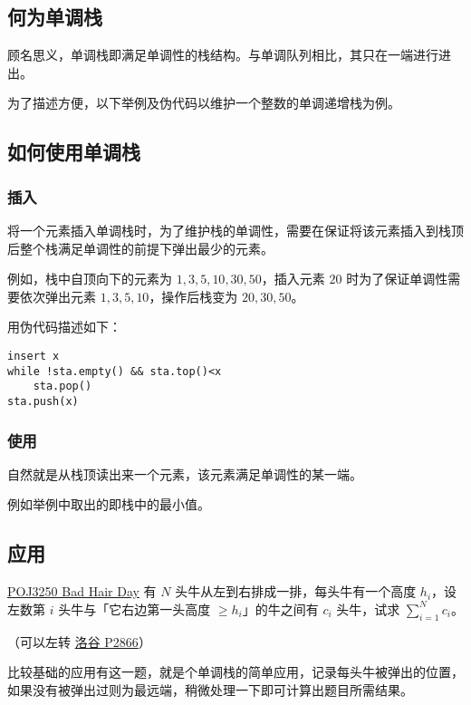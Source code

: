 
\subsection{何为单调栈}

顾名思义，单调栈即满足单调性的栈结构。与单调队列相比，其只在一端进行进出。

为了描述方便，以下举例及伪代码以维护一个整数的单调递增栈为例。

\subsection{如何使用单调栈}

\subsubsection{插入}

将一个元素插入单调栈时，为了维护栈的单调性，需要在保证将该元素插入到栈顶后整个栈满足单调性的前提下弹出最少的元素。

例如，栈中自顶向下的元素为 ${1,3,5,10,30,50}$，插入元素 $20$ 时为了保证单调性需要依次弹出元素 $1,3,5,10$，操作后栈变为 $20,30,50$。

用伪代码描述如下：

\begin{verbatim}
insert x
while !sta.empty() && sta.top()<x
    sta.pop()
sta.push(x)
\end{verbatim}

\subsubsection{使用}

自然就是从栈顶读出来一个元素，该元素满足单调性的某一端。

例如举例中取出的即栈中的最小值。

\subsection{应用}

\begin{NOTE}{\href{http://poj.org/problem?id=3250}{POJ3250 Bad Hair Day}}{}
有 $N$ 头牛从左到右排成一排，每头牛有一个高度 $h_i$，设左数第 $i$ 头牛与「它右边第一头高度 $≥h_i$」的牛之间有 $c_i$ 头牛，试求 $\sum_{i=1}^{N} c_i$。

（可以左转 \href{https://www.luogu.org/problemnew/show/P2866}{洛谷 P2866}）

\end{NOTE}


比较基础的应用有这一题，就是个单调栈的简单应用，记录每头牛被弹出的位置，如果没有被弹出过则为最远端，稍微处理一下即可计算出题目所需结果。
